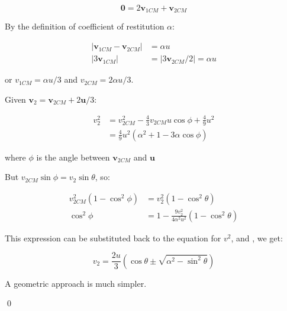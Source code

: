 \documentclass[12pt]{article}
\begin{document}
\begin{equation}
    \mathbf{0} = 2\mathbf{v}_{1CM} + \mathbf{v}_{2CM}
\end{equation}

By the definition of coefficient of restitution $\alpha$:

\begin{equation}
\begin{split}
    \left\lvert \mathbf{v}_{1CM} - \mathbf{v}_{2CM} \right\rvert &= \alpha u \\
    \left\lvert 3\mathbf{v}_{1CM} \right\rvert &= \left\lvert 3\mathbf{v}_{2CM}/2 \right\rvert = \alpha u
\end{split}
\end{equation}

or $v_{1CM} = \alpha u/3$ and $v_{2CM} = 2\alpha u/3$.

Given $\mathbf{v}_{2} = \mathbf{v}_{2CM} + 2\mathbf{u}/3$:

\begin{equation}
\begin{split}
    v_{2}^{2} &= v_{2CM}^{2} - \frac{4}{3} v_{2CM} u \cos{\phi} + \frac{4}{9} u^{2} \\
              &= \frac{4}{9} u^{2} \left( \alpha^{2} + 1 - 3 \alpha \cos{\phi} \right)
\end{split}
\end{equation}

where $\phi$ is the angle between $\mathbf{v}_{2CM}$ and $\mathbf{u}$

But $v_{2CM}\sin{\phi} = v_{2}\sin{\theta}$, so:

\begin{equation}
\begin{split}
    v_{2CM}^{2}(1 - \cos^{2}{\phi}) &= v_{2}^{2}(1 - \cos^{2}{\theta}) \\
    \cos^{2}{\phi} &= 1 - \frac{9v_{2}^{2}}{4 \alpha^{2} u^{2}} (1 - \cos^{2}{\theta})
\end{split}
\end{equation}

This expression can be substituted back to the equation for $v^{2}$, and , we get:

\begin{equation}
    v_{2} = \frac{2u}{3} \left( \cos{\theta} \pm \sqrt{\alpha^{2} - \sin^{2}{\theta}} \right)
\end{equation}

\begin{correction}
    A geometric approach is much simpler.
\end{correction}
\qed
\end{document}
